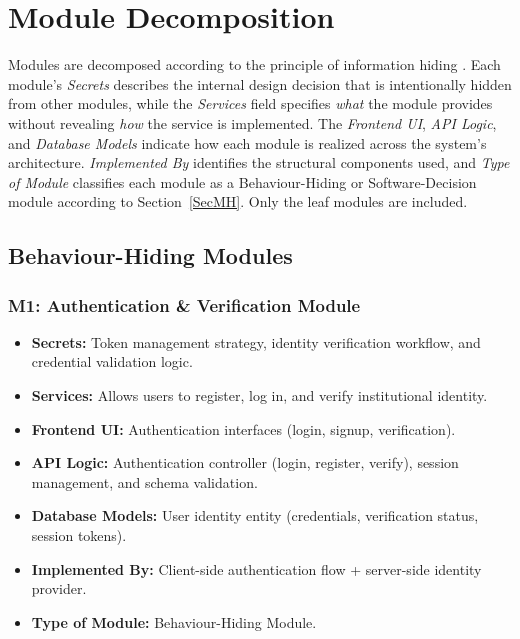 \section{Module Decomposition} \label{SecMD}

\begingroup
\setlength{\parindent}{0pt}

Modules are decomposed according to the principle of information hiding
\citep{ParnasEtAl1984}. 
Each module's \textit{Secrets} describes the internal design decision that is
intentionally hidden from other modules, while the \textit{Services} field specifies
\textit{what} the module provides without revealing \textit{how} the service is implemented. 
The \textit{Frontend UI}, \textit{API Logic}, and \textit{Database Models} indicate 
how each module is realized across the system's architecture. 
\textit{Implemented By} identifies the structural components used, and 
\textit{Type of Module} classifies each module as a Behaviour-Hiding or 
Software-Decision module according to Section~\ref{SecMH}. 
Only the leaf modules are included.

\subsection*{Behaviour-Hiding Modules}

\subsubsection*{M1: Authentication \& Verification Module}
\begin{itemize}
  \item \textbf{Secrets:} Token management strategy, identity verification workflow, and credential validation logic.
  \item \textbf{Services:} Allows users to register, log in, and verify institutional identity.
  \item \textbf{Frontend UI:} Authentication interfaces (login, signup, verification).
  \item \textbf{API Logic:} Authentication controller (login, register, verify), session management, and schema validation.
  \item \textbf{Database Models:} User identity entity (credentials, verification status, session tokens).
  \item \textbf{Implemented By:} Client-side authentication flow + server-side identity provider.
  \item \textbf{Type of Module:} Behaviour-Hiding Module.
\end{itemize}

